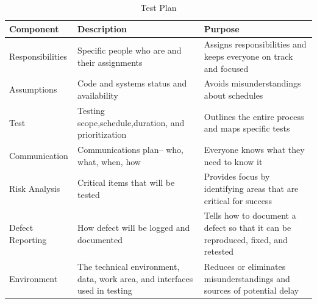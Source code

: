 \begin{table}[ht]
    \caption{Test Plan}
    \begin{tabular}{ |p{5cm}|p{5cm}|p{5cm}|  }
    \hline
    \textbf{Component} & \textbf{Description} & \textbf{Purpose}\\
    \hline
    Responsibilities & Specific people who are and their assignments & Assigns responsibilities and keeps everyone on track and focused\\\hline

    Assumptions & Code and systems status and availability & Avoids misunderstandings about schedules \\\hline
    
    Test & Testing scope,schedule,duration, and prioritization & Outlines the entire process and maps specific tests \\\hline
    
    Communication & Communications plan-- who, what, when, how & Everyone knows what they need to know it \\\hline
    
    Risk Analysis & Critical items that will be tested & Provides focus by identifying areas that are critical for success \\\hline
    
    Defect Reporting & How defect will be logged and documented & Tells how to document a defect so that it can be reproduced, fixed, and retested \\\hline
    
    Environment & The technical environment, data, work area, and interfaces used in testing & Reduces or eliminates misunderstandings and sources of potential delay \\
 
    \hline
    \end{tabular}
\end{table}

